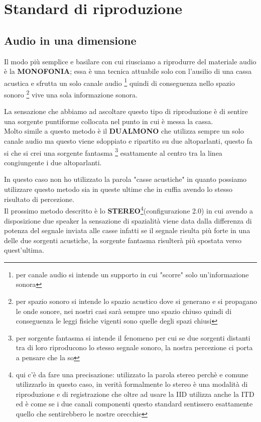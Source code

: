 \documentclass[12pt,a4paper]{report}
\begin{document}


\section{Standard di riproduzione}\label{metodi}

\subsection{Audio in una dimensione}
Il modo più semplice e basilare con cui riusciamo a riprodurre del materiale audio è la \textbf{MONOFONIA}; essa è una tecnica attuabile solo con l'ausilio di una cassa acustica e sfrutta un solo canale audio \footnote{per canale audio si intende un supporto in cui "scorre" solo un'informazione sonora}
quindi di conseguenza nello spazio sonoro \footnote{per spazio sonoro si intende lo spazio acustico dove si generano e si propagano le onde sonore, nei nostri casi sarà sempre uno spazio chiuso quindi di conseguenza le leggi fisiche vigenti sono quelle degli spazi chiusi} vive una sola informazione sonora.

La sensazione che abbiamo ad ascoltare questo tipo di riproduzione è di sentire una sorgente puntiforme collocata nel punto in cui è messa la cassa.\\

Molto simile a questo metodo è il \textbf{DUALMONO} che utilizza sempre un solo canale audio ma questo viene sdoppiato e ripartito su due altoparlanti, questo fa si che si crei una sorgente fantasma \footnote{per sorgente fantasma si intende il fenomeno per cui se due sorgenti distanti tra di loro riproducono lo stesso segnale sonoro, la nostra percezione ci porta a pensare che la so} esattamente al centro tra la linea congiungente i due altoparlanti. 

In questo caso non ho utilizzato la parola "casse acustiche" in quanto possiamo utilizzare questo metodo sia in queste ultime che in cuffia avendo lo stesso risultato di percezione.\\

Il prossimo metodo descritto è lo \textbf{STEREO}\footnote{qui c'è da fare una precisazione: utilizzato la parola stereo perchè e comune utilizzarlo in questo caso, in verità formalmente lo stereo è una modalità di riproduzione e di registrazione che oltre ad usare la IID utilizza anche la ITD ed è come se i due canali componenti questo standard sentissero esattamente quello che sentirebbero le nostre orecchie}(configurazione 2.0) in cui avendo a disposizione due speaker la sensazione di spazialità viene data dalla differenza di potenza del segnale inviata alle casse infatti se il segnale risulta più forte in una delle due sorgenti acustiche, la sorgente fantasma risulterà più spostata verso quest'ultima.
\end{document}
